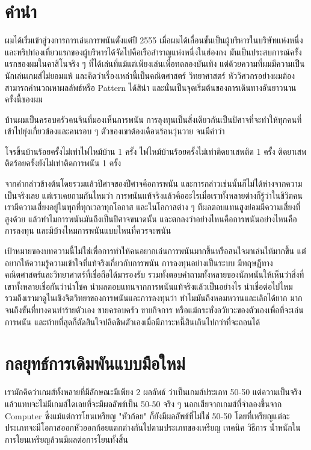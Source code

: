 \documentclass[12pt]{article}
\author{อธิปัตย์ ล้อวงศ์งาม}
\title{\scalebox{2}{\textbf{ประสบการณ์การพนันและการลงทุน}}}
\date{\today}
\begin{document}
\pagecolor{lightyellow}
\maketitle
\newpage
\tableofcontents

\newpage
\section{คำนำ}
ผมได้เริ่มเข้าสู่วงการการเล่นการพนันตั้งแต่ปี 2555 เมื่อผมได้เลื่อนขั้นเป็นผู้บริหารในบริษัทแห่งหนึ่งและทริปท่องเที่ยวแรกของผู้บริหารได้จัดไปคือเรือสำราญแห่งหนึ่งในฮ่องกง มันเป็นประสบการณ์ครั้งแรกของผมในคาสิโนจริง ๆ ที่ได้เล่นที่แม้แต่เพียงเล่นเพื่อทดลองบันเทิง แต่ด้วยความที่ผมมีความเป็นนักเล่นเกมส์ไม่ยอมแพ้ และคิดว่าเรื่องเหล่านี้เป็นคณิตศาสตร์ วิทยาศาสตร์ หัววิศวกรอย่างผมต้องสามารถคำนวณหาผลลัพธ์หรือ Pattern ได้สิน่า และนั่นเป็นจุดเริ่มต้นของการเดินทางอันยาวนานครั้งนี้ของผม

บ้านผมเป็นครอบครัวคนจีนที่มองเห็นการพนัน การลุงทุนเป็นสิ่งเดียวกันเป็นปีศาจที่จะทำให้ทุกคนที่เข้าไปยุ่งเกี่ยวข้องและคนรอบ ๆ ตัวของเขาต้องเดือนร้อนวุ่นวาย จนมีคำว่า

\begin{displayquote}
โจรขึ้นบ้านร้อยครั้งไม่เท่าไฟไหม้บ้าน 1 ครั้ง ไฟไหม้บ้านร้อยครั้งไม่เท่าติดยาเสพติด 1 ครั้ง ติดยาเสพติดร้อยครั้งยังไม่เท่าติดการพนัน 1 ครั้ง
\end{displayquote}

จากคำกล่าวข้างต้นโดยรวมแล้วปีศาจของปีศาจคือการพนัน และการกล่าวเช่นนั้นก็ไม่ได้ห่างจากความเป็นจริงเลย แต่เราเคยถามกันไหมว่า การพนันแท้จริงแล้วคืออะไรเมื่อเราทั้งหลายต่างก็รู้ว่าในชีวิตคนเรามีความเสี่ยงอยู่ในทุกที่ทุกเวลาทุกโอกาส และในโอกาสต่าง ๆ ทีผลตอบแทนสูงย่อมมีความเสี่ยงที่สูงด้วย แล้วทำไมการพนันมันถึงเป็นปีศาจขนาดนั้น และตกลงว่าอย่างไหนคือการพนันอย่างไหนคือการลงทุน และมีบ้างไหมการพนันแบบไหนที่ควรจะพนัน

เป้าหมายของบทความนี้ไม่ใช่เพื่อการทำให้คนอยากเล่นการพนันมากขึ้นหรือสนใจมาเล่นให้มากขึ้น แต่่อยากให้ความรู้ความเข้าใจที่แท้จริงเกี่ยวกับการพนัน การลงทุนอย่างเป็นระบบ มีทฤษฏีทางคณิตศาสตร์และวิทยาศาตร์ที่เชื่อถือได้มารองรับ รวมทั้งตอบคำถามทั้งหลายของนักพนันให้เห็นว่าสิ่งที่เขาทั้งหลายเชื่อกันว่านำโชค นำผลตอบแทนจากการพนันแท้จริงแล้วเป็นอย่างไร น่าเชื่อต่อไปไหม รวมถึงเรามาดูในเชิงจิตวิทยาของการพนันและการลงทุนว่า ทำไมมันถึงหอมหวานและเลิกได้ยาก มากจนถึงขั้นที่บางคนทำร้ายตัวเอง ขายครอบครัว ขายกิจการ หรือแม้กระทั่งอวัยวะของตัวเองเพื่อที่จะเล่นการพนัน และท้ายที่สุดก็ตัดสินใจปลิดชีพตัวเองเมื่อมีภาระหนี้สินเกินไปกว่าที่จะถอนได้

\newpage
\section{กลยุทธ์การเดิมพันแบบมือใหม่}
เรามักคิดว่าเกมส์ทั้งหลายที่มีลักษณะมีเพียง 2 ผลลัพธ์ ว่าเป็นเกมส์ประเภท 50-50 แต่ความเป็นจริงแล้วแทบจะไม่มีเกมส์ใดเลยที่จะมีผลลัพธ์เป็น 50-50 จริง ๆ นอกเสียจากเกมส์ที่จำลองขึ้นจาก Computer ซึ่งแม้แต่การโยนเหรียญ "หัวก้อย" ก็ยังมีผลลัพธ์ที่ไม่ใช่ 50-50 โดยที่เหรียญแต่ละประเภทจะมีโอกาสออกหัวออกก้อยแตกต่างกันไปตามประเภทของเหรียญ เทคนิค วิธีการ น้ำหนักในการโยนเหรียญล้วนมีผลต่อการโยนทั้งสิ้น
\end{document}

